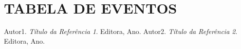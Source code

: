 \documentclass[12]{iptex}
\begin{document}
\newpage

\section{TABELA DE EVENTOS}





\newpage
\begin{thebibliography}{9}
   Autor1. \emph{Título da Referência 1}. Editora, Ano.
   Autor2. \emph{Título da Referência 2}. Editora, Ano.
\end{thebibliography}
\end{document}
